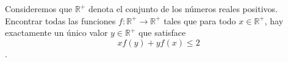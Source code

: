 \begin{problem}
	Consideremos que $\mathbb{R}^+$ denota el conjunto de los números reales positivos. Encontrar todas las funciones $f: \mathbb{R}^+ \to \mathbb{R}^+$ tales que para todo $x \in \mathbb{R}^+$, hay exactamente un único valor $y \in \mathbb{R}^+$ que satisface $$xf(y)+yf(x) \leq 2$$.
\end{problem}
